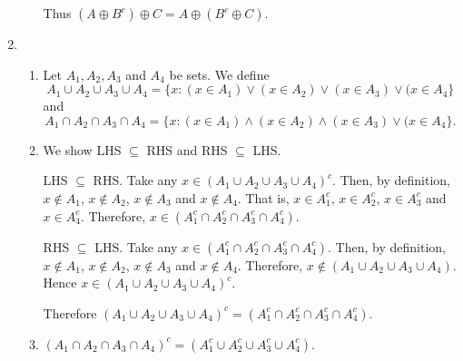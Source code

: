 \documentclass[12 pt]{article}
\begin{document}
\begin{enumerate}
\begin{enumerate}
Thus $(A \oplus B^c) \oplus C =  A \oplus (B^c \oplus C)$.

 \end{enumerate}
 
 
 \item \begin{enumerate}
 \item Let $A_1, A_2, A_3$ and $A_4$ be sets.  We define
  $$A_1 \cup A_2 \cup A_3 \cup A_4 = \{x: (x \in A_1) \vee (x \in A_2) \vee (x \in A_3) \vee (x \in A_4\}$$
  and 
 $$A_1 \cap A_2 \cap A_3 \cap A_4 = \{x: (x \in A_1) \wedge (x \in A_2) \wedge (x \in A_3) \vee (x \in A_4\}.$$
 
 \item We show LHS $\subseteq$  RHS and RHS $\subseteq$ LHS.
 
 \smallskip
LHS $\subseteq$  RHS.
Take any $x \in  (A_1 \cup A_2 \cup A_3 \cup A_4)^c$.
Then, by definition, $x \not\in A_1$, $x \not\in A_2$, $x \not\in A_3$ and $x \not\in A_4$.
That is,  $x \in A_1^c$, $x \in A_2^c$, $x \in A_3^c$ and $x \in A_4^c$.
Therefore, $x \in (A_1^c \cap A_2^c \cap A_3^c \cap A_4^c)$.

\smallskip
RHS $\subseteq$ LHS.
Take any $x \in  (A_1^c \cap A_2^c \cap A_3^c \cap A_4^c)$.
Then, by definition, $x \not\in A_1$, $x \not\in A_2$, $x \not\in A_3$ and $x \not\in A_4$.
Therefore, $x \not\in (A_1 \cup A_2 \cup A_3 \cup A_4)$.
Hence $x \in (A_1 \cup A_2 \cup A_3 \cup A_4)^c$.

\smallskip
Therefore $(A_1 \cup A_2 \cup A_3 \cup A_4)^c = (A_1^c \cap A_2^c \cap A_3^c \cap A_4^c)$.

\item $(A_1 \cap A_2 \cap A_3 \cap A_4)^c = (A_1^c \cup A_2^c \cup A_3^c \cup A_4^c)$.

 \end{enumerate}
 
 
\end{enumerate}
\end{document}
